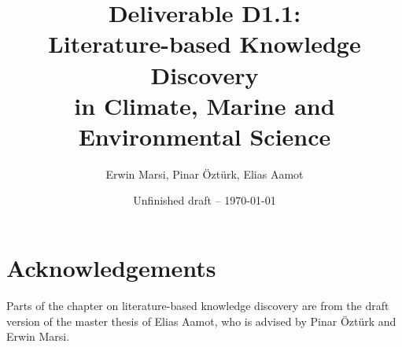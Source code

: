 \documentclass[11pt,oneside,a4paper]{report}
\begin{document}
\title{Deliverable D1.1:\\ Literature-based Knowledge Discovery\\in Climate, Marine and Environmental Science}
\author{Erwin Marsi, Pinar \"Ozt\"urk, Elias Aamot}
\date{Unfinished draft -- \today}
\maketitle

\abstract{}

\tableofcontents

\chapter*{Acknowledgements}

Parts of the chapter on literature-based knowledge discovery are from the draft version of the master thesis of Elias Aamot, who is advised by Pinar \"Ozt\"urk and Erwin Marsi.    













\end{document}

